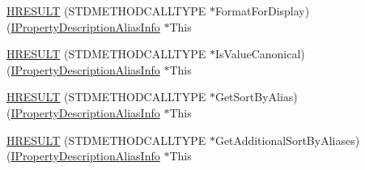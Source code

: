\begin{DoxyCompactItemize}
\item 
\hyperlink{struct_i_property_description_alias_info_vtbl_acd1d38aa844038fc91eac23932aa6f81}{H\+R\+E\+S\+U\+LT} (S\+T\+D\+M\+E\+T\+H\+O\+D\+C\+A\+L\+L\+T\+Y\+PE $\ast$Format\+For\+Display)(\hyperlink{propsys_8h_a340fea8f1bc0adf5146e75d71bbdf9bc}{I\+Property\+Description\+Alias\+Info} $\ast$This
\item 
\hyperlink{struct_i_property_description_alias_info_vtbl_a62e63efa62ea4f958bdb686885ffc5d7}{H\+R\+E\+S\+U\+LT} (S\+T\+D\+M\+E\+T\+H\+O\+D\+C\+A\+L\+L\+T\+Y\+PE $\ast$Is\+Value\+Canonical)(\hyperlink{propsys_8h_a340fea8f1bc0adf5146e75d71bbdf9bc}{I\+Property\+Description\+Alias\+Info} $\ast$This
\item 
\hyperlink{struct_i_property_description_alias_info_vtbl_abb37cda144a790f282bc8795ab401a97}{H\+R\+E\+S\+U\+LT} (S\+T\+D\+M\+E\+T\+H\+O\+D\+C\+A\+L\+L\+T\+Y\+PE $\ast$Get\+Sort\+By\+Alias)(\hyperlink{propsys_8h_a340fea8f1bc0adf5146e75d71bbdf9bc}{I\+Property\+Description\+Alias\+Info} $\ast$This
\item 
\hyperlink{struct_i_property_description_alias_info_vtbl_a87eeb6c7b79bc89b5c0935185b6207db}{H\+R\+E\+S\+U\+LT} (S\+T\+D\+M\+E\+T\+H\+O\+D\+C\+A\+L\+L\+T\+Y\+PE $\ast$Get\+Additional\+Sort\+By\+Aliases)(\hyperlink{propsys_8h_a340fea8f1bc0adf5146e75d71bbdf9bc}{I\+Property\+Description\+Alias\+Info} $\ast$This
\end{DoxyCompactItemize}
